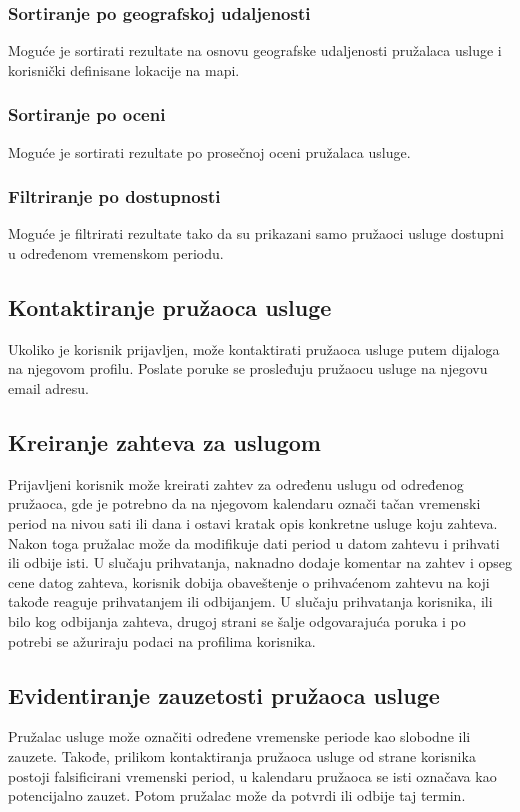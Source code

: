 \documentclass[a4paper,12pt]{report}
\begin{document}
\subsubsection{Sortiranje po geografskoj udaljenosti}
Moguće je sortirati rezultate na osnovu geografske udaljenosti pružalaca usluge i korisnički definisane lokacije na mapi.
\subsubsection{Sortiranje po oceni}
Moguće je sortirati rezultate po prosečnoj oceni pružalaca usluge.
\subsubsection{Filtriranje po dostupnosti}
Moguće je filtrirati rezultate tako da su prikazani samo pružaoci usluge dostupni u određenom vremenskom periodu.
\subsection{Kontaktiranje pružaoca usluge}
Ukoliko je korisnik prijavljen, može kontaktirati pružaoca usluge putem dijaloga na njegovom profilu. Poslate poruke se prosleđuju pružaocu usluge na njegovu email adresu.
\subsection{Kreiranje zahteva za uslugom}
Prijavljeni korisnik može kreirati zahtev za određenu uslugu od određenog pružaoca, gde je potrebno da na njegovom kalendaru označi tačan vremenski period na nivou sati ili dana i ostavi kratak opis konkretne usluge koju zahteva. Nakon toga pružalac može da modifikuje dati period u datom zahtevu i prihvati ili odbije isti. U slučaju prihvatanja, naknadno dodaje komentar na zahtev i opseg cene datog zahteva, korisnik dobija obaveštenje o prihvaćenom zahtevu na koji takođe reaguje prihvatanjem ili odbijanjem. U slučaju prihvatanja korisnika, ili bilo kog odbijanja zahteva, drugoj strani se šalje odgovarajuća poruka i po potrebi se ažuriraju podaci na profilima korisnika. 
\subsection{Evidentiranje zauzetosti pružaoca usluge}
Pružalac usluge može označiti određene vremenske periode kao slobodne ili zauzete. Takođe, prilikom kontaktiranja pružaoca usluge od strane korisnika postoji falsificirani vremenski period, u kalendaru pružaoca se isti označava kao potencijalno zauzet. Potom pružalac može da potvrdi ili odbije taj termin.
\end{document}
